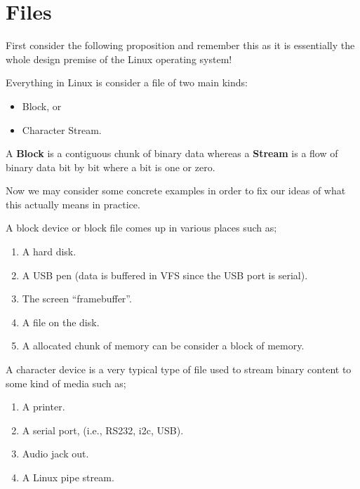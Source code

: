 
\section{Files} %
\label{sec:files}

First consider the following proposition and remember this as it
is essentially the whole design premise of the Linux operating system!

\begin{prop}
	Everything in Linux is consider a file of two main kinds:
	\begin{itemize}
		\item Block, or
		\item Character Stream.
	\end{itemize}
	A \textbf{Block} is a contiguous chunk of binary data whereas
	a \textbf{Stream} is a flow of binary data bit by bit where a
	bit is one or zero.
\end{prop}

Now we may consider some concrete examples in order to fix our ideas
of what this actually means in practice.

\begin{exmp}
	A block device or block file comes up in various places such as;
	\begin{enumerate}
		\item A hard disk.
		\item A USB pen (data is buffered in VFS since the USB port is serial).
		\item The screen ``framebuffer''.
		\item A file on the disk.
		\item A allocated chunk of memory can be consider a block of memory.
	\end{enumerate}
\end{exmp}

\begin{exmp}
	A character device is a very typical type of file used to stream
	binary content to some kind of media such as;
	\begin{enumerate}
		\item A printer.
		\item A serial port, (i.e., RS232, i2c, USB).
		\item Audio jack out.
		\item A Linux pipe stream.
	\end{enumerate}
\end{exmp}

